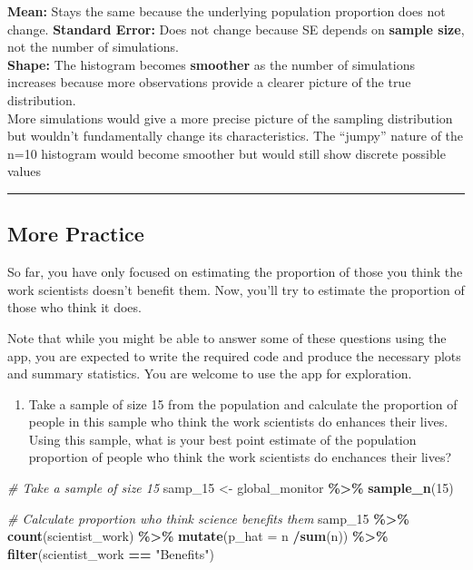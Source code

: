\documentclass[
]{article}
\newenvironment{Shaded}{\begin{snugshade}}{\end{snugshade}}
\newcommand{\AttributeTok}[1]{\textcolor[rgb]{0.13,0.29,0.53}{#1}}
\newcommand{\CommentTok}[1]{\textcolor[rgb]{0.56,0.35,0.01}{\textit{#1}}}
\newcommand{\DecValTok}[1]{\textcolor[rgb]{0.00,0.00,0.81}{#1}}
\newcommand{\FunctionTok}[1]{\textcolor[rgb]{0.13,0.29,0.53}{\textbf{#1}}}
\newcommand{\NormalTok}[1]{#1}
\newcommand{\OtherTok}[1]{\textcolor[rgb]{0.56,0.35,0.01}{#1}}
\newcommand{\SpecialCharTok}[1]{\textcolor[rgb]{0.81,0.36,0.00}{\textbf{#1}}}
\newcommand{\StringTok}[1]{\textcolor[rgb]{0.31,0.60,0.02}{#1}}
\providecommand{\tightlist}{%
  \setlength{\itemsep}{0pt}\setlength{\parskip}{0pt}}
\begin{document}
\textbf{Mean:} Stays the same because the underlying population
proportion does not change. \textbf{Standard Error:} Does not change
because SE depends on \textbf{sample size}, not the number of
simulations.\\
\textbf{Shape:} The histogram becomes \textbf{smoother} as the number of
simulations increases because more observations provide a clearer
picture of the true distribution.\\
More simulations would give a more precise picture of the sampling
distribution but wouldn't fundamentally change its characteristics. The
``jumpy'' nature of the n=10 histogram would become smoother but would
still show discrete possible values

\begin{center}\rule{0.5\linewidth}{0.5pt}\end{center}

\subsection{More Practice}\label{more-practice}

So far, you have only focused on estimating the proportion of those you
think the work scientists doesn't benefit them. Now, you'll try to
estimate the proportion of those who think it does.

Note that while you might be able to answer some of these questions
using the app, you are expected to write the required code and produce
the necessary plots and summary statistics. You are welcome to use the
app for exploration.

\begin{enumerate}
\def\labelenumi{\arabic{enumi}.}
\setcounter{enumi}{6}
\tightlist
\item
  Take a sample of size 15 from the population and calculate the
  proportion of people in this sample who think the work scientists do
  enhances their lives. Using this sample, what is your best point
  estimate of the population proportion of people who think the work
  scientists do enchances their lives?
\end{enumerate}

\begin{Shaded}
\begin{Highlighting}[]
\CommentTok{\# Take a sample of size 15}
\NormalTok{samp\_15 }\OtherTok{\textless{}{-}}\NormalTok{ global\_monitor }\SpecialCharTok{\%\textgreater{}\%}
  \FunctionTok{sample\_n}\NormalTok{(}\DecValTok{15}\NormalTok{)}

\CommentTok{\# Calculate proportion who think science benefits them}
\NormalTok{samp\_15 }\SpecialCharTok{\%\textgreater{}\%}
  \FunctionTok{count}\NormalTok{(scientist\_work) }\SpecialCharTok{\%\textgreater{}\%}
  \FunctionTok{mutate}\NormalTok{(}\AttributeTok{p\_hat =}\NormalTok{ n }\SpecialCharTok{/}\FunctionTok{sum}\NormalTok{(n)) }\SpecialCharTok{\%\textgreater{}\%}
  \FunctionTok{filter}\NormalTok{(scientist\_work }\SpecialCharTok{==} \StringTok{"Benefits"}\NormalTok{)}
\end{Highlighting}
\end{Shaded}
\end{document}
